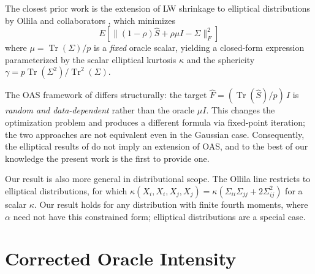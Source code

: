 \documentclass[journal]{IEEEtran}
\begin{document}
The closest prior work is the extension of LW shrinkage to elliptical distributions by
Ollila and collaborators \cite{Ollila2017,OllilaRaninen2019,Ollila2023}, which minimizes
\begin{equation*}
E\!\left[\lVert (1-\rho)\hat{S} + \rho\mu I - \Sigma \rVert_F^2\right]
\end{equation*}
where $\mu = \operatorname{Tr}(\Sigma)/p$ is a \emph{fixed} oracle scalar, yielding a
closed-form expression parameterized by the scalar elliptical kurtosis $\kappa$ and
the sphericity $\gamma = p\operatorname{Tr}(\Sigma^2)/\operatorname{Tr}^2(\Sigma)$.

The OAS framework of \cite{OAS} differs structurally: the target
$\hat{F} = (\operatorname{Tr}(\hat{S})/p)\,I$ is \emph{random and data-dependent} rather
than the oracle $\mu I$.
This changes the optimization problem and produces a different formula via fixed-point
iteration; the two approaches are not equivalent even in the Gaussian case.
Consequently, the elliptical results of \cite{Ollila2017,OllilaRaninen2019} do not imply
an extension of OAS, and to the best of our knowledge the present work is the first to
provide one.

Our result is also more general in distributional scope.
The Ollila line restricts to elliptical distributions, for which
$\kappa(X_i,X_i,X_j,X_j) = \kappa(\Sigma_{ii}\Sigma_{jj}+2\Sigma_{ij}^2)$
for a scalar $\kappa$.
Our result holds for any distribution with finite fourth moments, where $\alpha$ need not
have this constrained form; elliptical distributions are a special case.

\section{Corrected Oracle Intensity}\label{sec-formulation}
\end{document}
